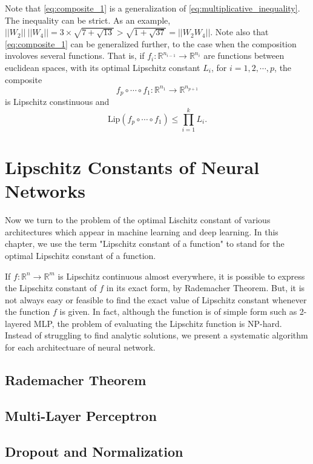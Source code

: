 \documentclass[12pt]{report}
\numberwithin{figure}{chapter}
\theoremstyle{plain}
\theoremstyle{definition}
\theoremstyle{corollary}
\theoremstyle{definition}
\theoremstyle{plain}
\theoremstyle{definition}
\theoremstyle{plain}
\newcommand\lip{\ensuremath{\text{Lip}}}
\begin{document}
Note that \eqref{eq:composite_1} is a generalization of \eqref{eq:multiplicative_inequality}.
The inequality can be strict.
As an example, \(||W_2||\:||W_4||=3\times\sqrt{7+\sqrt{13}}>\sqrt{1+\sqrt{37}}=||W_2W_4||\).
Note also that \eqref{eq:composite_1} can be generalized further, to the case when the composition involoves several functions.
That is, if \(f_i:\mathbb R^{n_{i-1}}\to\mathbb R^{n_i}\) are  functions between euclidean spaces, with its optimal Lipschitz constant \(L_i\), for \(i=1,2,\cdots,p\), the composite
\[f_p\circ\cdots\circ f_1:\mathbb R^{n_1}\to\mathbb R^{n_{p+1}}\]
is Lipschitz constinuous and
\begin{equation}\label{eq:composite_2}
\lip(f_p\circ\cdots\circ f_1)\le\prod_{i=1}^kL_i.
\end{equation}

\chapter{Lipschitz Constants of Neural Networks}

Now we turn to the problem of the optimal Lischitz constant of various architectures which appear in machine learning and deep learning.
In this chapter, we use the term "Lipschitz constant of a function" to stand for the optimal Lipschitz constant of a function.

If \(f:\mathbb R^n\to\mathbb R^m\) is Lipschitz continuous almost everywhere, it is possible to express the Lipschitz constant of \(f\) in its exact form, by Rademacher Theorem.
But, it is not always easy or feasible to find the exact value of Lipschitz constant whenever the function \(f\) is given.
In fact, although the function is of simple form such as 2-layered MLP, the problem of evaluating the Lipschitz function is NP-hard.
Instead of struggling to find analytic solutions, we present a systematic algorithm for each architectuare of neural network.

\section{Rademacher Theorem}

\section{Multi-Layer Perceptron}

\section{Dropout and Normalization}
\end{document}
